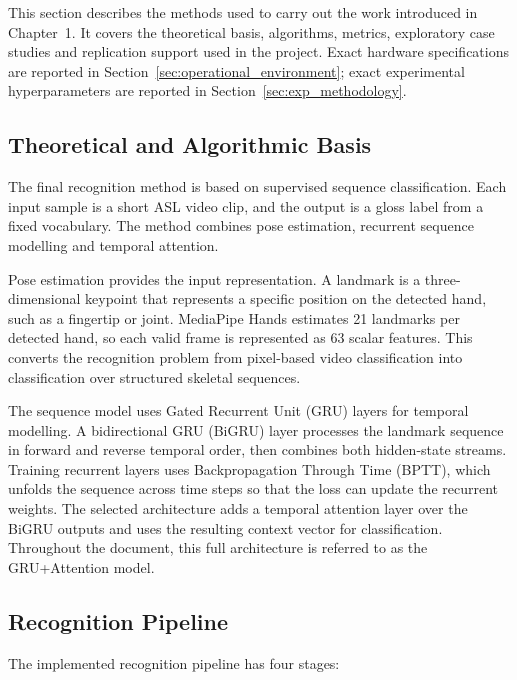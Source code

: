 This section describes the methods used to carry out the work introduced in Chapter~1. It covers
the theoretical basis, algorithms, metrics, exploratory case studies and replication support used
in the project. Exact hardware specifications are reported in
Section~\ref{sec:operational_environment}; exact experimental hyperparameters are reported in
Section~\ref{sec:exp_methodology}.

\subsection{Theoretical and Algorithmic Basis}

The final recognition method is based on supervised sequence classification. Each input sample is a
short ASL video clip, and the output is a gloss label from a fixed vocabulary. The method combines
pose estimation, recurrent sequence modelling and temporal attention.

Pose estimation provides the input representation. A landmark is a three-dimensional keypoint that
represents a specific position on the detected hand, such as a fingertip or joint. MediaPipe Hands
estimates 21 landmarks per detected hand, so each valid frame is represented as 63 scalar features.
This converts the recognition problem from pixel-based video classification into classification
over structured skeletal sequences.

The sequence model uses Gated Recurrent Unit (GRU) layers for temporal modelling. A bidirectional
GRU (BiGRU) layer processes the landmark sequence in forward and reverse temporal order, then
combines both hidden-state streams. Training recurrent layers uses Backpropagation Through Time
(BPTT), which unfolds the sequence across time steps so that the loss can update the recurrent
weights. The selected architecture adds a temporal attention layer over the BiGRU outputs and uses
the resulting context vector for classification. Throughout the document, this full architecture is
referred to as the GRU+Attention model.

\subsection{Recognition Pipeline}
\label{subsec:recognition_pipeline}

The implemented recognition pipeline has four stages:

